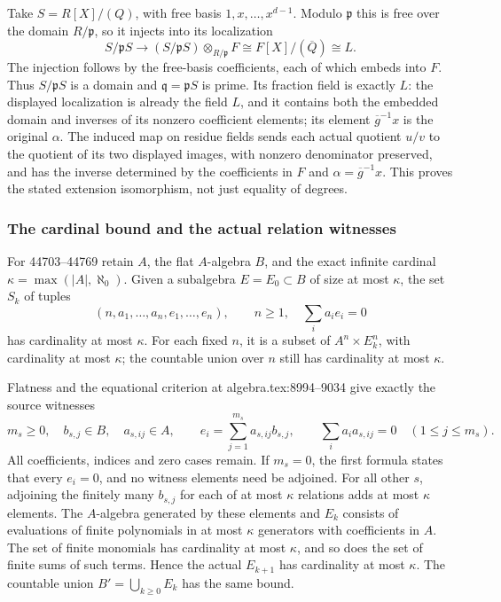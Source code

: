 Take \(S=R[X]/(Q)\), with free basis \(1,x,\ldots,x^{d-1}\). Modulo \(\mathfrak p\) this is free over the domain \(R/\mathfrak p\), so it injects into its localization \[
 S/\mathfrak pS\longrightarrow
 (S/\mathfrak pS)\otimes_{R/\mathfrak p}F
       \cong F[X]/(\overline Q)\cong L.
\] The injection follows by the free-basis coefficients, each of which embeds into \(F\). Thus \(S/\mathfrak pS\) is a domain and \(\mathfrak q=\mathfrak pS\) is prime. Its fraction field is exactly \(L\): the displayed localization is already the field \(L\), and it contains both the embedded domain and inverses of its nonzero coefficient elements; its element \(\overline g^{-1}x\) is the original \(\alpha\). The induced map on residue fields sends each actual quotient \(u/v\) to the quotient of its two displayed images, with nonzero denominator preserved, and has the inverse determined by the coefficients in \(F\) and \(\alpha=\overline g^{-1}x\). This proves the stated extension isomorphism, not just equality of degrees.

\subsubsection{The cardinal bound and the actual relation witnesses}\label{algebra-proof-064-the-cardinal-bound-and-the-actual-relation-witnesses}

For 44703--44769 retain \(A\), the flat \(A\)-algebra \(B\), and the exact infinite cardinal \(\kappa=\max(|A|,\aleph_0)\). Given a subalgebra \(E=E_0\subset B\) of size at most \(\kappa\), the set \(S_k\) of tuples \[
 (n,a_1,\ldots,a_n,e_1,\ldots,e_n),\qquad
 n\geq1,\quad \sum_i a_ie_i=0
\] has cardinality at most \(\kappa\). For each fixed \(n\), it is a subset of \(A^n\times E_k^n\), with cardinality at most \(\kappa\); the countable union over \(n\) still has cardinality at most \(\kappa\).

Flatness and the equational criterion at algebra.\AlgebraIdentifierBreak{}tex:\AlgebraIdentifierBreak{}8994--\AlgebraIdentifierBreak{}9034 give exactly the source witnesses \[
 m_s\geq0,\quad b_{s,j}\in B,\quad a_{s,ij}\in A,\qquad
 e_i=\sum_{j=1}^{m_s}a_{s,ij}b_{s,j},\qquad
 \sum_i a_i a_{s,ij}=0\quad(1\leq j\leq m_s).
\] All coefficients, indices and zero cases remain. If \(m_s=0\), the first formula states that every \(e_i=0\), and no witness elements need be adjoined. For all other \(s\), adjoining the finitely many \(b_{s,j}\) for each of at most \(\kappa\) relations adds at most \(\kappa\) elements. The \(A\)-algebra generated by these elements and \(E_k\) consists of evaluations of finite polynomials in at most \(\kappa\) generators with coefficients in \(A\). The set of finite monomials has cardinality at most \(\kappa\), and so does the set of finite sums of such terms. Hence the actual \(E_{k+1}\) has cardinality at most \(\kappa\). The countable union \(B'=\bigcup_{k\geq0}E_k\) has the same bound.

